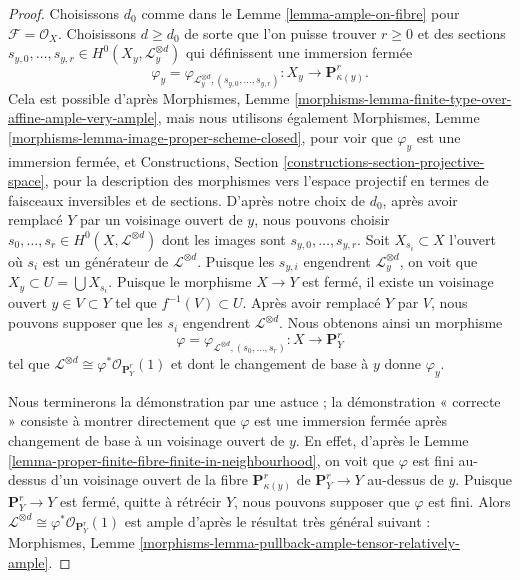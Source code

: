 \begin{proof}
Choisissons $d_0$ comme dans le Lemme \ref{lemma-ample-on-fibre} pour
$\mathcal{F} = \mathcal{O}_X$. Choisissons $d \geq d_0$
de sorte que l'on puisse trouver $r \geq 0$ et des sections
$s_{y, 0}, \ldots, s_{y, r} \in H^0(X_y, \mathcal{L}_y^{\otimes d})$
qui définissent une immersion fermée
$$
\varphi_y =
\varphi_{\mathcal{L}_y^{\otimes d}, (s_{y, 0}, \ldots, s_{y, r})} :
X_y \to \mathbf{P}^r_{\kappa(y)}.
$$
Cela est possible d'après Morphismes, Lemme
\ref{morphisms-lemma-finite-type-over-affine-ample-very-ample},
mais nous utilisons également
Morphismes, Lemme \ref{morphisms-lemma-image-proper-scheme-closed},
pour voir que $\varphi_y$ est une immersion fermée, et
Constructions, Section \ref{constructions-section-projective-space},
pour la description des morphismes vers l'espace projectif
en termes de faisceaux inversibles et de sections.
D'après notre choix de $d_0$, après avoir remplacé $Y$ par un voisinage ouvert
de $y$, nous pouvons choisir
$s_0, \ldots, s_r \in H^0(X, \mathcal{L}^{\otimes d})$
dont les images sont $s_{y, 0}, \ldots, s_{y, r}$.
Soit $X_{s_i} \subset X$ l'ouvert où $s_i$
est un générateur de $\mathcal{L}^{\otimes d}$. Puisque
les $s_{y, i}$ engendrent $\mathcal{L}_y^{\otimes d}$, on voit que
$X_y \subset U = \bigcup X_{s_i}$.
Puisque le morphisme $X \to Y$ est fermé,
il existe un voisinage ouvert $y \in V \subset Y$
tel que $f^{-1}(V) \subset U$.
Après avoir remplacé $Y$ par $V$, nous pouvons supposer que
les $s_i$ engendrent $\mathcal{L}^{\otimes d}$. Nous obtenons ainsi
un morphisme
$$
\varphi = \varphi_{\mathcal{L}^{\otimes d}, (s_0, \ldots, s_r)} :
X \longrightarrow \mathbf{P}^r_Y
$$
tel que $\mathcal{L}^{\otimes d} \cong \varphi^*\mathcal{O}_{\mathbf{P}^r_Y}(1)$
et dont le changement de base à $y$ donne $\varphi_y$.

\medskip\noindent
Nous terminerons la démonstration par une astuce ; la démonstration « correcte »
consiste à montrer directement que $\varphi$ est une immersion
fermée après changement de base à un voisinage ouvert de $y$.
En effet, d'après le Lemme \ref{lemma-proper-finite-fibre-finite-in-neighbourhood},
on voit que $\varphi$ est fini au-dessus d'un voisinage ouvert
de la fibre $\mathbf{P}^r_{\kappa(y)}$ de $\mathbf{P}^r_Y \to Y$
au-dessus de $y$. Puisque $\mathbf{P}^r_Y \to Y$ est fermé,
quitte à rétrécir $Y$, nous pouvons supposer que $\varphi$ est fini.
Alors $\mathcal{L}^{\otimes d} \cong \varphi^*\mathcal{O}_{\mathbf{P}^r_Y}(1)$
est ample d'après le résultat très général suivant :
Morphismes, Lemme \ref{morphisms-lemma-pullback-ample-tensor-relatively-ample}.
\end{proof}





